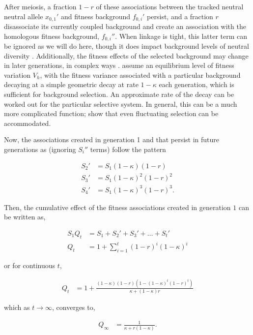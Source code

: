 \documentclass[11pt]{article}
\begin{document}
After meiosis, a fraction $1-r$ of these associations between the tracked
neutral neutral allele $x_{0,1}'$ and fitness background $f_{0,i}'$ persist,
and a fraction $r$ disassociate its currently coupled background and create an
association with the homologous fitness background, $f_{0,i}''$. When linkage
is tight, this latter term can be ignored as we will do here, though it does
impact background levels of neutral diversity \parencite{Santiago1995-hx}.
Additionally, the fitness effects of the selected background may change in
later generations, in complex ways \parencite{Barton1986-yh,Turelli1990-kd}.
\textcite{Santiago1995-hx} assume an equilibrium level of fitness variation
$V_h$, with the fitness variance associated with a particular background
decaying at a simple geometric decay at rate $1-\kappa$ each generation, which
is sufficient for background selection. An approximate rate of the decay can be
worked out for the particular selective system. In general, this can be a much
more complicated function; \textcite{Buffalo2019-qs} show that even fluctuating
selection can be accommodated.

Now, the associations created in generation 1 and that persist in future
generations as (ignoring $S_i''$ terms) follow the pattern

\begin{align}
  S_{2}' &= S_1 (1-\kappa)(1-r) \\
  S_{3}' &= S_1 (1-\kappa)^2(1-r)^2 \\
  S_{4}' &= S_1 (1-\kappa)^3(1-r)^3.
\end{align}

Then, the cumulative effect of the fitness associations created in generation
$1$ can be written as,

\begin{align}
  \label{eq:qterm}
  S_1 Q_t &= S_1 + S_2' + S_3' + \ldots + S_t' \\
  Q_t &= 1 + \sum_{i=1}^t (1-r)^i(1-\kappa)^i
\end{align}

or for continuous $t$, 

\begin{align}
  \label{eq:q_t}
  Q_t &= 1+\frac{(1-\kappa) (1-r) \left(1-(1-\kappa)^t (1-r)^t\right)}{\kappa+(1-\kappa)r}
\end{align}

which as $t \to \infty$, converges to,

\begin{align}
  \label{eq:Qinf}
  Q_\infty &= \frac{1}{\kappa + r(1-\kappa)}.
\end{align}
\end{document}
